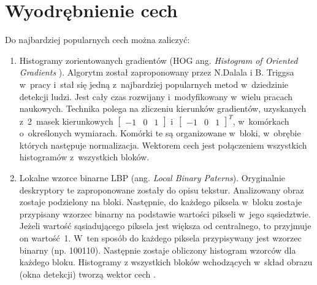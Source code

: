\section{Wyodrębnienie cech}

Do najbardziej popularnych cech można zaliczyć:

\begin{enumerate}
\item Histogramy zorientowanych gradientów (HOG ang. \textit{Histogram of Oriented Gradients }).
Algorytm został zaproponowany przez N.Dalala i B. Triggsa w~pracy \cite{dalal2005histograms} i~stał się jedną z~najbardziej popularnych metod w~dziedzinie detekcji ludzi. 
Jest cały czas rozwijany i~modyfikowany w~wielu pracach naukowych.
Technika polega na zliczeniu kierunków gradientów, uzyskanych z~2~masek kierunkowych \(\begin{bmatrix}-1 & 0 & 1\end{bmatrix} \) i~\( \begin{bmatrix}-1 & 0 & 1 \end{bmatrix}^T\), w~komórkach o~określonych wymiarach.
Komórki te są organizowane w~bloki, w~obrębie których następuje normalizacja.
Wektorem cech jest połączeniem wszystkich histogramów z~wszystkich bloków.


\item Lokalne wzorce binarne LBP (ang. \textit{Local Binary Paterns}).
Oryginalnie deskryptory te zaproponowane zostały do opisu tekstur. %
Analizowany obraz zostaje podzielony na bloki.
Następnie, do każdego piksela w~bloku zostaje przypisany wzorzec binarny na podstawie wartości pikseli w~jego sąsiedztwie.
Jeżeli wartość sąsiadującego piksela jest większa od centralnego, to przyjmuje on wartość~1. 
W~ten sposób do każdego piksela przypisywany jest wzorzec binarny (np. 100110). %
Następnie zostaje obliczony histogram wzorców dla każdego bloku.
Histogramy z wszystkich bloków wchodzących w~skład obrazu (okna detekcji) tworzą wektor cech \cite{ojala2002multiresolution}.


\end{enumerate}

